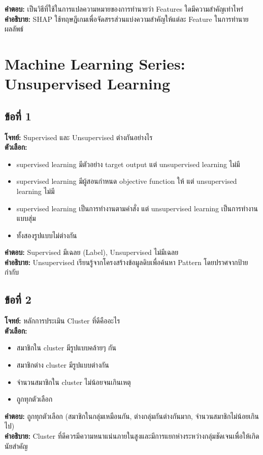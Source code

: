 \documentclass[12pt]{article}
\begin{document}
\textbf{คำตอบ:} เป็นวิธีที่ใช้ในการแปลความหมายของการทำนายว่า Features ใดมีความสำคัญเท่าไหร่\\
\textbf{คำอธิบาย:} SHAP ใช้ทฤษฎีเกมเพื่อจัดสรรส่วนแบ่งความสำคัญให้แต่ละ Feature ในการทำนายผลลัพธ์

\newpage
\section{Machine Learning Series: Unsupervised Learning}

\subsection*{ข้อที่ 1}
\textbf{โจทย์:} Supervised และ Unsupervised ต่างกันอย่างไร\\
\textbf{ตัวเลือก:}
\begin{itemize}
    \item supervised learning มีตัวอย่าง target output แต่ unsupervised learning ไม่มี
    \item supervised learning มีผู้สอนกำหนด objective function ให้ แต่ unsupervised learning ไม่มี
    \item supervised learning เป็นการทำงานตามคำสั่ง แต่ unsupervised learning เป็นการทำงานแบบสุ่ม
    \item ทั้งสองรูปแบบไม่ต่างกัน
\end{itemize}

\textbf{คำตอบ:} Supervised มีเฉลย (Label), Unsupervised ไม่มีเฉลย\\
\textbf{คำอธิบาย:} Unsupervised เรียนรู้จากโครงสร้างข้อมูลดิบเพื่อค้นหา Pattern โดยปราศจากป้ายกำกับ

\subsection*{ข้อที่ 2}
\textbf{โจทย์:} หลักการประเมิน Cluster ที่ดีคืออะไร\\
\textbf{ตัวเลือก:}
\begin{itemize}
    \item สมาชิกใน cluster มีรูปแบบคล้ายๆ กัน
    \item สมาชิกต่าง cluster มีรูปแบบต่างกัน
    \item จำนวนสมาชิกใน cluster ไม่น้อยจนเกินเหตุ
    \item ถูกทุกตัวเลือก
\end{itemize}

\textbf{คำตอบ:} ถูกทุกตัวเลือก (สมาชิกในกลุ่มเหมือนกัน, ต่างกลุ่มกันต่างกันมาก, จำนวนสมาชิกไม่น้อยเกินไป)\\
\textbf{คำอธิบาย:} Cluster ที่ดีควรมีความหนาแน่นภายในสูงและมีการแยกห่างระหว่างกลุ่มชัดเจนเพื่อให้เกิดนัยสำคัญ
\end{document}
